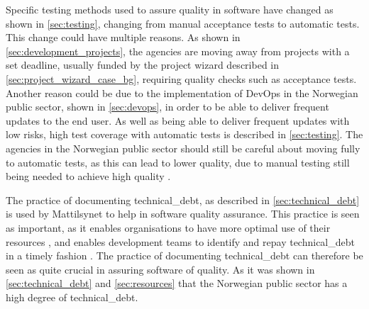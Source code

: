 Specific testing methods used to assure quality in software have changed as shown in \autoref{sec:testing}, changing from manual acceptance tests to automatic tests. This change could have multiple reasons. As shown in \autoref{sec:development_projects}, the agencies are moving away from projects with a set deadline, usually funded by the project wizard described in \autoref{sec:project_wizard_case_bg}, requiring quality checks such as acceptance tests. Another reason could be due to the implementation of DevOps in the Norwegian public sector, shown in \autoref{sec:devops}, in order to be able to deliver frequent updates to the end user. As well as being able to deliver frequent updates with low risks, high test coverage with automatic tests is described in \autoref{sec:testing}. The agencies in the Norwegian public sector should still be careful about moving fully to automatic tests, as this can lead to lower quality, due to manual testing still being needed to achieve high quality \cite{dsc_2019}. 


The practice of documenting \gls{technical_debt}, as described in \autoref{sec:technical_debt} is used by Mattilsynet to help in software quality assurance. This practice is seen as important, as it enables organisations to have more optimal use of their resources \cite{mv_2022}, and enables development teams to identify and repay \gls{technical_debt} in a timely fashion \cite{mv_2022}. The practice of documenting \gls{technical_debt} can therefore be seen as quite crucial in assuring software of quality. As it was shown in \autoref{sec:technical_debt} and \autoref{sec:resources} that the Norwegian public sector has a high degree of \gls{technical_debt}.

